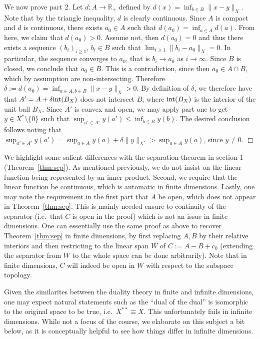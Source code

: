 \documentclass[11pt]{article}
\theoremstyle{plain}
\newenvironment{proof}{\noindent {\sc Proof:}}{$\Box$ \medskip}
\theoremstyle{plain}
\newcommand{\set}[1]{\{{#1}\}}
\newcommand{\R}{\ensuremath{\mathbb{R}}}
\begin{document}
\begin{proof}
We now prove part 2. Let $d: A \rightarrow \R_+$ defined by $d(x) = \inf_{b \in
B} \|x-y\|_X$. Note that by the triangle inequality, $d$ is clearly continuous.
Since $A$ is compact and $d$ is continuous, there exists $a_0 \in A$ such that
$d(a_0) = \inf_{a \in A} d(a)$. From here, we claim that $d(a_0) > 0$. Assume
not, then $d(a_0)=0$ and thus there exists a sequence $(b_i)_{i \geq 1}$, $b_i
\in B$ such that $\lim_{i \geq 1} \|b_i-a_0\|_X = 0$. In particular, the
sequence converges to $a_0$, that is $b_i \rightarrow
a_0$ as $i \rightarrow \infty$. Since $B$ is closed, we conclude that $a_0 \in
B$.  This is a contradiction, since then $a_0 \in A \cap B$, which by assumption
are non-intersecting. Therefore $\delta := d(a_0) = \inf_{a \in A, b \in B}
\|x-y\|_X > 0$. By definition of $\delta$, we therefore have that $A' = A +
\delta{\rm int}(B_X)$ does not intersect $B$, where ${\rm int}(B_X)$ is the
interior of the unit ball $B_X$. Since $A'$ is convex and open, we may apply
part one to get $y \in X^* \setminus \set{0}$ such that $\sup_{a' \in A'} y(a')
\leq \inf_{b \in B} y(b)$. The desired conclusion follows noting that $\sup_{a'
\in A'} y(a') = \sup_{a \in A} y(a) + \delta \|y\|_{X^*} > \sup_{a \in A} y(a)$,
since $y \neq 0$.  
\end{proof}

We highlight some salient differences with the separation theorem in section 1
(Theorem~\ref{thm:sep}). As mentioned previously, we do not insist on the linear
function being represented by an inner product. Second, we require that the
linear function be continuous, which is automatic in finite dimensions. Lastly,
one may note the requirement in the first part that $A$ be open, which does not
appear in Theorem~\ref{thm:sep}. This is mainly needed ensure to continuity of
the separator (i.e.~that $C$ is open in the proof) which is not an issue in
finite dimensions. One can essentially use the same proof as above to recover
Theorem~\ref{thm:sep} in finite dimensions, by first replacing $A,B$ by their
relative interiors and then restricting to the linear span $W$ of $C := A-B+c_0$
(extending the separator from $W$ to the whole space can be done arbitrarily).
Note that in finite dimensions, $C$ will indeed be open in $W$ with respect to
the subspace topology.

Given the similarites between the duality theory in finite and infinite
dimensions, one may expect natural statements such as the ``dual of the dual''
is isomorphic to the original space to be true, i.e.~$X^{**} \equiv X$. This
unfortunately fails in infinite dimensions. While not a focus of the course, we
elaborate on this subject a bit below, as it is conceptually helpful to see how
things differ in infinite dimensions. 
\end{document}
